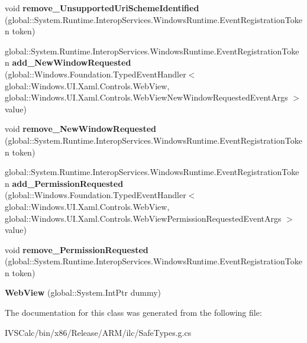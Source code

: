 \begin{DoxyCompactItemize}
\item 
\mbox{\label{class_windows_1_1_u_i_1_1_xaml_1_1_controls_1_1_web_view_ad9d3699273170c52d3176dbe3a72da3a}} 
void {\bfseries remove\+\_\+\+Unsupported\+Uri\+Scheme\+Identified} (global\+::\+System.\+Runtime.\+Interop\+Services.\+Windows\+Runtime.\+Event\+Registration\+Token token)
\item 
\mbox{\label{class_windows_1_1_u_i_1_1_xaml_1_1_controls_1_1_web_view_a6b7292bb084d6e2cc42455ef1fb709cb}} 
global\+::\+System.\+Runtime.\+Interop\+Services.\+Windows\+Runtime.\+Event\+Registration\+Token {\bfseries add\+\_\+\+New\+Window\+Requested} (global\+::\+Windows.\+Foundation.\+Typed\+Event\+Handler$<$ global\+::\+Windows.\+U\+I.\+Xaml.\+Controls.\+Web\+View, global\+::\+Windows.\+U\+I.\+Xaml.\+Controls.\+Web\+View\+New\+Window\+Requested\+Event\+Args $>$ value)
\item 
\mbox{\label{class_windows_1_1_u_i_1_1_xaml_1_1_controls_1_1_web_view_a9554c3ce448a56cf2c7e53f12a9b64ab}} 
void {\bfseries remove\+\_\+\+New\+Window\+Requested} (global\+::\+System.\+Runtime.\+Interop\+Services.\+Windows\+Runtime.\+Event\+Registration\+Token token)
\item 
\mbox{\label{class_windows_1_1_u_i_1_1_xaml_1_1_controls_1_1_web_view_a8b195c1782d78e750cd3a8375052a2ac}} 
global\+::\+System.\+Runtime.\+Interop\+Services.\+Windows\+Runtime.\+Event\+Registration\+Token {\bfseries add\+\_\+\+Permission\+Requested} (global\+::\+Windows.\+Foundation.\+Typed\+Event\+Handler$<$ global\+::\+Windows.\+U\+I.\+Xaml.\+Controls.\+Web\+View, global\+::\+Windows.\+U\+I.\+Xaml.\+Controls.\+Web\+View\+Permission\+Requested\+Event\+Args $>$ value)
\item 
\mbox{\label{class_windows_1_1_u_i_1_1_xaml_1_1_controls_1_1_web_view_ab7d2f3b264215a8d319fb8066899a6c3}} 
void {\bfseries remove\+\_\+\+Permission\+Requested} (global\+::\+System.\+Runtime.\+Interop\+Services.\+Windows\+Runtime.\+Event\+Registration\+Token token)
\item 
\mbox{\label{class_windows_1_1_u_i_1_1_xaml_1_1_controls_1_1_web_view_a1f6e579edf410985e15871fe75731922}} 
{\bfseries Web\+View} (global\+::\+System.\+Int\+Ptr dummy)
\end{DoxyCompactItemize}


The documentation for this class was generated from the following file\+:\begin{DoxyCompactItemize}
\item 
I\+V\+S\+Calc/bin/x86/\+Release/\+A\+R\+M/ilc/Safe\+Types.\+g.\+cs\end{DoxyCompactItemize}
